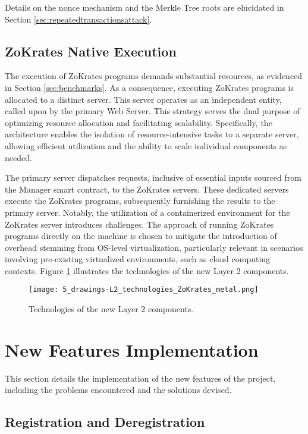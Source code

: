 Details on the nonce mechanism and the Merkle Tree roots are elucidated in Section \ref{sec:repeatedtransactionsattack}.

\subsection{ZoKrates Native Execution}
The execution of ZoKrates programs demands substantial resources, as evidenced in Section \ref{sec:benchmarks}. As a consequence, executing ZoKrates programs is allocated to a distinct server. This server operates as an independent entity, called upon by the primary Web Server. This strategy serves the dual purpose of optimizing resource allocation and facilitating scalability. Specifically, the architecture enables the isolation of resource-intensive tasks to a separate server, allowing efficient utilization and the ability to scale individual components as needed.

The primary server dispatches requests, inclusive of essential inputs sourced from the Manager smart contract, to the ZoKrates servers. These dedicated servers execute the ZoKrates programs, subsequently furnishing the results to the primary server. Notably, the utilization of a containerized environment for the ZoKrates server introduces challenges. The approach of running ZoKrates programs directly on the machine is chosen to mitigate the introduction of overhead stemming from OS-level virtualization, particularly relevant in scenarios involving pre-existing virtualized environments, such as cloud computing contexts. Figure \ref{fig:5_drawings-L2_technologies_ZoKrates_metal} illustrates the technologies of the new Layer 2 components.

\begin{figure}[ht]
	\centering
	\texttt{[image: 5\_drawings-L2\_technologies\_ZoKrates\_metal.png]}
	\caption[Scaling Solutions]{Technologies of the new Layer 2 components.}  
	\label{fig:5_drawings-L2_technologies_ZoKrates_metal}
  \end{figure} 


\section{New Features Implementation}
This section details the implementation of the new features of the project, including the problems encountered and the solutions devised.

\subsection{Registration and Deregistration}

